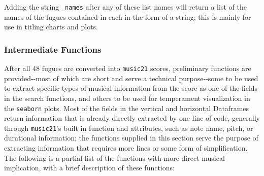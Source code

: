 Adding the string \texttt{\textquotesingle{}\_names\textquotesingle{}}
after any of these list names will return a list of the names of the
fugues contained in each in the form of a string; this is mainly for use
in titling charts and plots.

\subsubsection{Intermediate Functions}\label{intermediate-functions}

After all 48 fugues are converted into \texttt{music21} scores,
preliminary functions are provided-\/-most of which are short and serve
a technical purpose-\/-some to be used to extract specific types of
musical information from the score as one of the fields in the search
functions, and others to be used for temperament visualization in the
\texttt{seaborn} plots. Most of the fields in the vertical and
horizontal Dataframes return information that is already directly
extracted by one line of code, generally through \texttt{music21}'s
built in function and attributes, such as note name, pitch, or
durational information; the functions supplied in this section serve the
purpose of extracting information that requires more lines or some form
of simplification. The following is a partial list of the functions with
more direct musical implication, with a brief description of these
functions:

